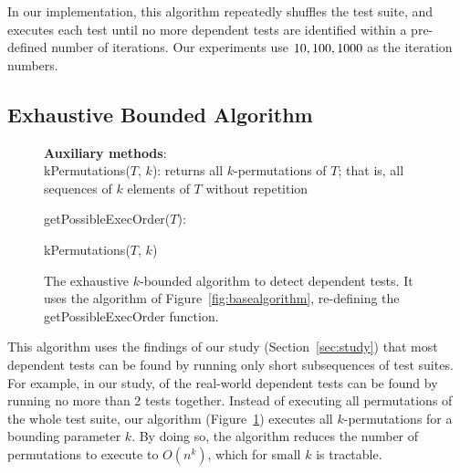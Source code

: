 In our implementation, this algorithm repeatedly
shuffles the test suite, and executes each test until
no more dependent tests are identified within a
pre-defined number of iterations. %
Our experiments use $10,
100, 1000$ as the iteration numbers.



\subsection{Exhaustive Bounded Algorithm}
\label{sec:basic}

\begin{figure}[t]
\textbf{Auxiliary methods}:\\
kPermutations($T$, $k$): returns all $k$-permutations of $T$; that is, all
sequences of $k$ elements of $T$ without repetition

\medskip

getPossibleExecOrder($T$):\\
\vspace{-5mm}
\begin{algorithmic}[1]
\RETURN kPermutations($T$, $k$)
\end{algorithmic}

\vspace{-3mm}
\caption {The exhaustive $k$-bounded algorithm to detect dependent tests.
It uses the algorithm of Figure~\ref{fig:basealgorithm}, re-defining the
getPossibleExecOrder function.
} 
\label{fig:exhaustivealgorithm}
\end{figure}



This algorithm uses the findings of our study
(Section~\ref{sec:study})
that most dependent tests can be found by running only short
subsequences of test suites. For example,
in our study, \pertange of the real-world dependent tests
can be found by running no more than 2 tests together.
Instead of executing all permutations of the
whole test suite, our algorithm (Figure~\ref{fig:exhaustivealgorithm})
executes all $k$-permutations for a bounding
parameter $k$.
By doing so, the algorithm reduces
the number of permutations to execute
to $O(n^k)$, which for small $k$ is tractable. 


